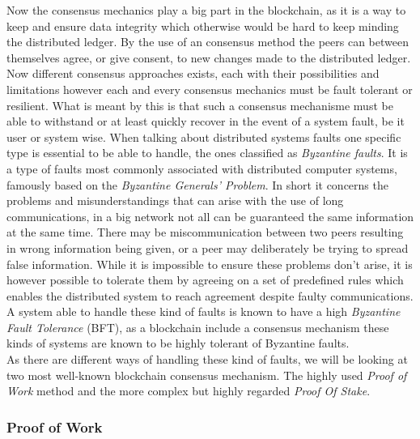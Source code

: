 \documentclass[paper=a4, fontsize=11pt]{scrartcl} %
\numberwithin{equation}{section} %
\numberwithin{figure}{section} %
\numberwithin{table}{section} %
\begin{document}
Now the consensus mechanics play a big part in the blockchain, as it is a way to keep and ensure data integrity which otherwise would be hard to keep minding the distributed ledger. By the use of an consensus method the peers can between themselves agree, or give consent, to new changes made to the distributed ledger. Now different consensus approaches exists, each with their possibilities and limitations however each and every consensus mechanics must be fault tolerant or resilient\cite{consensus}. What is meant by this is that such a consensus mechanisme must be able to withstand or at least quickly recover in the event of a system fault, be it user or system wise. When talking about distributed systems faults one specific type is essential to be able to handle, the ones classified as \textit{Byzantine faults}. It is a type of faults most commonly associated with distributed computer systems, famously based on the \textit{ Byzantine Generals' Problem}\cite{byzan}. In short it concerns the problems and misunderstandings that can arise with the use of long communications, in a big network not all can be guaranteed the same information at the same time. There may be miscommunication between two peers resulting in wrong information being given, or a peer may deliberately be trying to spread false information. While it is impossible to ensure these problems don't arise\cite{general}, it is however possible to tolerate them by agreeing on a set of predefined rules which enables the distributed system to reach agreement despite faulty communications. A system able to handle these kind of faults is known to have a high \textit{Byzantine Fault Tolerance} (BFT), as a blockchain include a consensus mechanism these kinds of systems are known to be highly tolerant of Byzantine faults\cite{byzan}.  \\

As there are different ways of handling these kind of faults, we will be looking at two most well-known blockchain consensus mechanism. The highly used \textit{Proof of Work} method and the more complex but highly regarded \textit{Proof Of Stake}. 

\subsubsection{Proof of Work}
\end{document}
